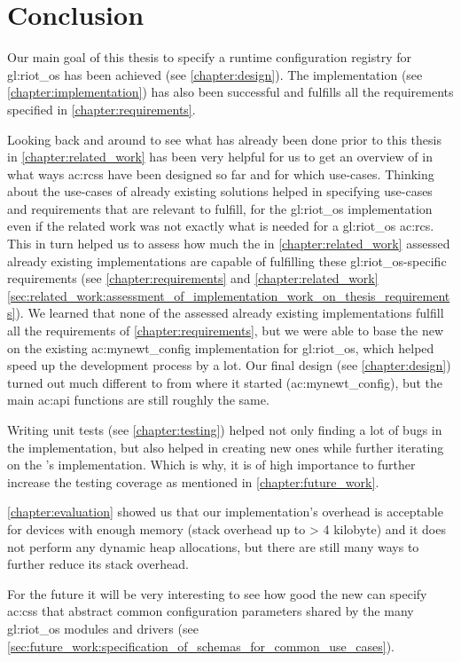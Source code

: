 \chapter{Conclusion}
\label{chapter:conclusion}

Our main goal of this thesis to specify a runtime configuration registry for \gls{gl:riot_os} has been achieved (see \autoref{chapter:design}).
The implementation (see \autoref{chapter:implementation}) has also been successful and fulfills all the requirements specified in \autoref{chapter:requirements}.

Looking back and around to see what has already been done prior to this thesis in \autoref{chapter:related_work} has been very helpful for us to get an overview of in what ways \glspl{ac:rcs} have been designed so far and for which use-cases.
Thinking about the use-cases of already existing solutions helped in specifying use-cases and requirements that are relevant to fulfill, for the \gls{gl:riot_os} implementation even if the related work was not exactly what is needed for a \gls{gl:riot_os} \gls{ac:rcs}.
This in turn helped us to assess how much the in \autoref{chapter:related_work} assessed already existing implementations are capable of fulfilling these \gls{gl:riot_os}-specific requirements (see \autoref{chapter:requirements} and \autoref{chapter:related_work} \autoref{sec:related_work:assessment_of_implementation_work_on_thesis_requirements}).
We learned that none of the assessed already existing implementations fulfill all the requirements of \autoref{chapter:requirements}, but we were able to base the new  on the existing \gls{ac:mynewt_config} implementation for \gls{gl:riot_os}, which helped speed up the development process by a lot.
Our final design (see \autoref{chapter:design}) turned out much different to from where it started (\gls{ac:mynewt_config}), but the main \gls{ac:api} functions are still roughly the same.

Writing unit tests (see \autoref{chapter:testing}) helped not only finding a lot of bugs in the  implementation, but also helped in creating new ones while further iterating on the 's implementation.
Which is why, it is of high importance to further increase the testing coverage as mentioned in \autoref{chapter:future_work}.

\autoref{chapter:evaluation} showed us that our implementation's overhead is acceptable for devices with enough memory (stack overhead up to > 4 kilobyte) and it does not perform any dynamic heap allocations, but there are still many ways to further reduce its stack overhead.

For the future it will be very interesting to see how good the new  can specify \glspl{ac:cs} that abstract common configuration parameters shared by the many \gls{gl:riot_os} modules and drivers (see \autoref{sec:future_work:specification_of_schemas_for_common_use_cases}).

\nocite{never_gonna_give_you_up}
